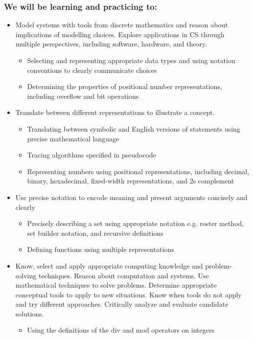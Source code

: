 \subsubsection*{We will be learning and practicing to:}
\begin{itemize}
\item Model systems with tools from discrete mathematics and reason about implications of modelling choices. Explore applications in CS through multiple perspectives, including software, hardware, and theory.
\begin{itemize}
   \item Selecting and representing appropriate data types and using notation conventions to clearly communicate choices
   \item Determining the properties of positional number representations, including overflow and bit operations
\end{itemize}

\item Translate between different representations to illustrate a concept.

\begin{itemize}
   \item Translating between symbolic and English versions of statements using precise mathematical language
   \item Tracing algorithms specified in pseudocode
   \item Representing numbers using positional representations, including decimal, binary, hexadecimal, fixed-width representations, and 2s complement
\end{itemize}


\item Use precise notation to encode meaning and present arguments concisely and clearly
\begin{itemize}
    \item Precisely describing a set using appropriate notation e.g. roster method, set builder notation, and recursive definitions
    \item Defining functions using multiple representations
\end{itemize}

\item Know, select and apply appropriate computing knowledge and problem-solving techniques. Reason about computation and systems. Use mathematical techniques to solve problems. Determine appropriate conceptual tools to apply to new situations. Know when tools do not apply and try different approaches. Critically analyze and evaluate candidate solutions.
\begin{itemize}
    \item Using the definitions of the div and mod operators on integers
\end{itemize}

\end{itemize}

